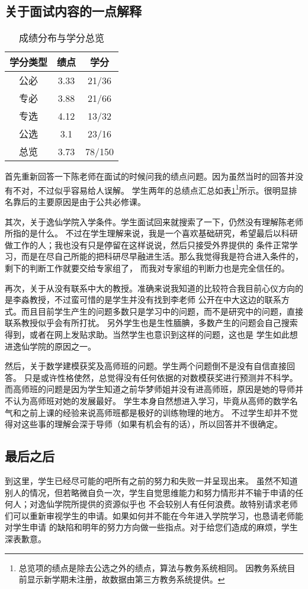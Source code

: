 \documentclass[10pt,a4paper]{article}
\begin{document}
\begin{spacing}{1.6}
\subsection{关于面试内容的一点解释}
\begin{table}[h]
\centering
\caption{成绩分布与学分总览}
\begin{tabular}{c c c}
\hline
学分类型 & 绩点 & 学分\\ [.2ex]
\hline \hline
公必 & 3.33	&21/36  \\
专必 & 3.88	&21/66 \\
专选 & 4.12 &13/32 \\
公选 & 3.1	&23/16 \\
总览 & 3.73	&78/150 \\ [.2ex]
\hline
\end{tabular}
\label{t:gr}
\end{table}
首先重新回答一下陈老师在面试的时候问我的绩点问题。因为虽然当时的回答并没有不对，不过似乎容易给人误解。
学生两年的总绩点汇总如表\ref{t:gr}\footnote{总览项的绩点是除去公选之外的绩点，算法与教务系统相同。
因教务系统目前显示新学期未注册，故数据由第三方教务系统提供。}所示。很明显排名靠后的主要原因是由于公共必修课。\par
其次，关于逸仙学院入学条件。学生面试回来就搜索了一下，仍然没有理解陈老师所指的是什么。
不过在学生理解来说，我是一个喜欢基础研究，希望最后以科研做工作的人；我也没有只是停留在这样说说，然后只接受外界提供的
条件正常学习，而是在尽自己所能的把科研尽早融进生活。那么我觉得我是符合进入条件的，剩下的判断工作就要交给专家组了，
而我对专家组的判断力也是完全信任的。\par
再次，关于从没有联系中大的教授。准确来说我知道的比较符合我目前心仪方向的是李淼教授，不过蛮可惜的是学生并没有找到李老师
公开在中大这边的联系方式。而且目前学生产生的问题多数只是学习中的问题，而不是研究中的问题，直接联系教授似乎会有所打扰。
另外学生也是生性腼腆，多数产生的问题会自己搜索得到，或者在网\cite{phyfor}上发贴求助。当然学生也意识到这样的问题，这也是
学生如此想进逸仙学院的原因之一。\par
然后，关于数学建模获奖及高师班的问题。学生两个问题倒不是没有自信直接回答。
只是或许性格使然，总觉得没有任何依据的对数模获奖进行预测并不科学。
而高师班的问题是因为学生知道之前华梦师姐并没有进高师班，原因是她的导师并不认为高师班对她的发展最好。
学生本身自然想进入学习，毕竟从高师的数学名气和之前上课的经验来说高师班都是极好的训练物理的地方。
不过学生却并不觉得对这些事的理解会深于导师（如果有机会有的话），所以回答并不很确定。\par
\subsection{最后之后}
到这里，学生已经尽可能的吧所有之前的努力和失败一并呈现出来。
虽然不知道别人的情况，但若略微自负一次，学生自觉思维能力和努力情形并不输于申请的任何人；对逸仙学院所提供的资源似乎也
不会较别人有任何浪费。故特别请求老师们可以重新审视学生的申请。如果如何并不能在今年进入学院学习，也恳请老师能对学生申请
的缺陷和明年的努力方向做一些指点。对于给您们造成的麻烦，学生深表歉意。

\end{spacing}

\medskip
\renewcommand\refname{提到的书籍和网页}


\end{document}
